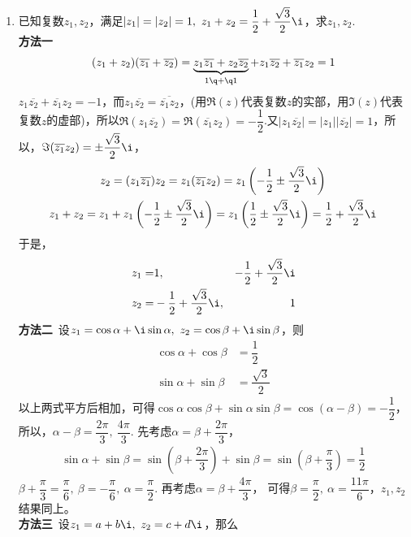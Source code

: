 \begin{enumerate}[label={【\textbf{例\thechapter.\arabic*}】},
 leftmargin=\inteval{\myenumleftmargin}pt,
 itemsep=\inteval{\myenumitempsep}pt,
 itemindent=\inteval{\myenumitemindent}pt]
\item \label{复数多元二次方程求解演示}
已知复数$ z_1,z_2 $，满足$ |z_1|=|z_2|=1,\ z_1+z_2=
\dfrac{1}{2}+\dfrac{\sqrt{3}}{2}\i $，求$ z_1,z_2 $. \\
\textbf{方法一}\ 
\begin{align*}
    (z_1+z_2)(\overline{z_1}+\overline{z_2}) =
    \underbrace{z_1\overline{z_1}+z_2\overline{z_2}}_{1\q+\q 1}+
    z_1\overline{z_2}+\overline{z_1}z_2=1
\end{align*}
$ z_1\overline{z_2}+\overline{z_1}z_2=-1 $，而$ z_1\overline{z_2}=\overline{\overline{z_1}z_2} $，(用$ \Re (z) $代表复数$ z $的实部，用$ \Im (z) $代表复数$ z $的虚部)，所以$ \Re(z_1\overline{z_2})=\Re(\overline{z_1}z_2)=-\dfrac{1}{2} $.又$ |z_1\overline{z_2}|=|z_1||\overline{z_2}|=1 $，所以，$ \Im(\overline{z_1}z_2)=\pm \dfrac{\sqrt{3}}{2}\i $，
\begin{gather*}
    z_2=(z_1\overline{z_1})z_2=z_1(\overline{z_1}z_2)=z_1\left(
    -\dfrac{1}{2}\pm \dfrac{\sqrt{3}}{2}\i\right) \\
    z_1+z_2=z_1+z_1\left(-\dfrac{1}{2}\pm \dfrac{\sqrt{3}}{2}\i\right)
    =z_1\left(\dfrac{1}{2}\pm \dfrac{\sqrt{3}}{2}\i\right)=
    \dfrac{1}{2}+\dfrac{\sqrt{3}}{2}\i 
\end{gather*}
于是，
\begin{alignat*}{3}
    z_1=& 1, & -\dfrac{1}{2}+ \dfrac{\sqrt{3}}{2}\i \\
    z_2=& -\dfrac{1}{2}+ \dfrac{\sqrt{3}}{2}\i, & 1
\end{alignat*}
\textbf{方法二}\ 设$ z_1=\cos\alpha+\i\sin\alpha,\ z_2=\cos\beta+\i\sin\beta $，则
\begin{align*}
    \cos\alpha+\cos\beta &=\dfrac{1}{2} \\
    \sin\alpha+\sin\beta &=\dfrac{\sqrt{3}}{2} 
\end{align*}
以上两式平方后相加，可得$ \cos\alpha\cos\beta+\sin\alpha\sin\beta=\cos(\alpha
-\beta)=-\dfrac{1}{2} $，所以，$ \alpha-\beta=\dfrac{2\pi}{3},\ \dfrac{4\pi}{3} $.
先考虑$ \alpha=\beta+\dfrac{2\pi}{3} $，
\begin{align*}
    \sin\alpha+\sin\beta =\sin\left(\beta+\dfrac{2\pi}{3}\right) +
    \sin\beta =\sin\left(\beta+\dfrac{\pi}{3}\right) =\dfrac{1}{2}
\end{align*}
$ \beta+\dfrac{\pi}{3}=\dfrac{\pi}{6},\ \beta=-\dfrac{\pi}{6},
\ \alpha=\dfrac{\pi}{2} $. 再考虑$ \alpha=\beta+\dfrac{4\pi}{3} $，
可得$ \beta=\dfrac{\pi}{2},\ \alpha=\dfrac{11\pi}{6} $，$ z_1,z_2 $结果同上。\\
\textbf{方法三}\ 设$ z_1=a+b\i,\ z_2=c+d\i $，那么

\end{enumerate}
